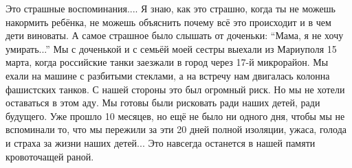 
Это страшные воспоминания.... Я знаю, как это страшно, когда ты не можешь
накормить ребёнка, не можешь объяснить почему всё это происходит и в чем дети
виноваты. А самое страшное было слышать от доченьки: \enquote{Мама, я не хочу
умирать...} Мы с доченькой и с семьёй моей сестры выехали из Мариуполя 15
марта, когда российские танки заезжали в город через 17-й микрорайон. Мы ехали
на машине с разбитыми стеклами, а на встречу нам двигалась колонна фашистских
танков. С нашей стороны это был огромный риск. Но мы не хотели оставаться в
этом аду. Мы готовы были рисковать ради наших детей, ради будущего. Уже прошло
10 месяцев, но ещё не было ни одного дня, чтобы мы не вспоминали то, что мы
пережили за эти 20 дней полной изоляции, ужаса, голода и страха за жизни наших
детей... Это навсегда останется в нашей памяти кровоточащей раной.

